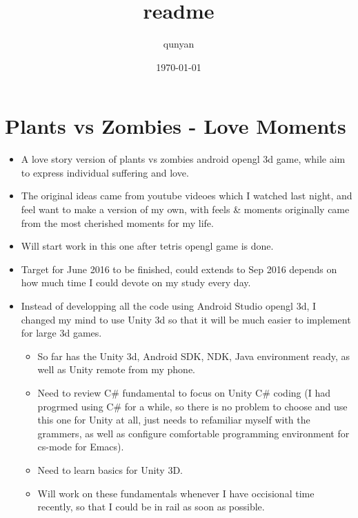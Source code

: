 \documentclass{article}
\author{qunyan}
\date{\today}
\title{readme}
\begin{document}
\maketitle
\tableofcontents

\section{Plants vs Zombies - Love Moments}
\label{sec-1}
\begin{itemize}
\item A love story version of plants vs zombies android opengl 3d game, while aim to express individual suffering and love.
\item The original ideas came from youtube videoes which I watched last night, and feel want to make a version of my own, with feels \& moments originally came from the most cherished moments for my life.
\item Will start work in this one after tetris opengl game is done.
\item Target for June 2016 to be finished, could extends to Sep 2016 depends on how much time I could devote on my study every day.
\item Instead of developping all the code using Android Studio opengl 3d, I changed my mind to use Unity 3d so that it will be much easier to implement for large 3d games. 
\begin{itemize}
\item So far has the Unity 3d, Android SDK, NDK, Java environment ready, as well as Unity remote from my phone.
\item Need to review C\# fundamental to focus on Unity C\# coding (I had progrmed using C\# for a while, so there is no problem to choose and use this one for Unity at all, just needs to refamiliar myself with the grammers, as well as configure comfortable programming environment for cs-mode for Emacs).
\item Need to learn basics for Unity 3D.
\item Will work on these fundamentals whenever I have occisional time recently, so that I could be in rail as soon as possible.
\end{itemize}
\end{itemize}
\end{document}

